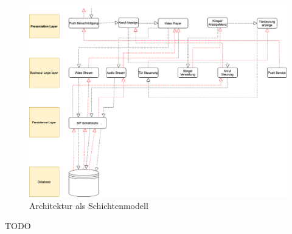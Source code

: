 \begin{figure}[ht!]
    \centering\includegraphics[width=\paperwidth/2]{../assets/img/layered-architecture-pattern.drawio}

    \caption{Architektur als Schichtenmodell}
    \label{fig:schichtenmodell}
\end{figure}
TODO